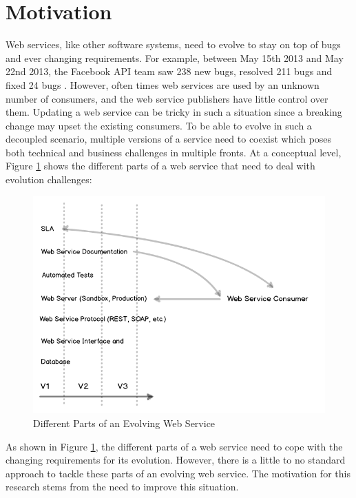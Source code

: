 \documentclass[runningheads,a4paper]{llncs}
\begin{document}
\section{Motivation} %
\label{sec:motivation}
Web services, like other software systems, need to evolve to stay on top of bugs and ever changing requirements. For example, between May 15th 2013 and May 22nd 2013, the Facebook API team saw 238 new bugs, resolved 211 bugs and fixed 24 bugs \cite{facebook_release_note}. However, often times web services are used by an unknown number of consumers, and the web service publishers have little control over them. Updating a web service can be tricky in such a situation since a breaking change may upset the existing consumers. To be able to evolve in such a decoupled scenario, multiple versions of a service need to coexist which poses both technical and business challenges in multiple fronts. At a conceptual level, Figure \ref{fig:web_service_layers} shows the different parts of a web service that need to deal with evolution challenges:


\begin{figure}[ht]
  \centering
  \includegraphics[width=\textwidth]{web_service_layers.png}
    \caption{Different Parts of an Evolving Web Service}
  \label{fig:web_service_layers}
\end{figure}

As shown in Figure \ref{fig:web_service_layers}, the different parts of a web service need to cope with the changing requirements for its evolution. However, there is a little to no standard approach to tackle these parts of an evolving web service. The motivation for this research stems from the need to improve this situation.
\end{document}
